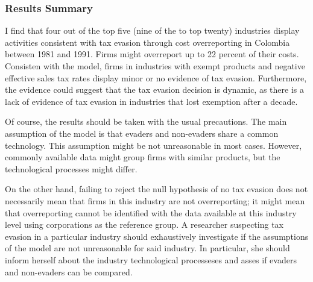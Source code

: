 \documentclass[
  12pt]{article}
\theoremstyle{definition}
\theoremstyle{remark}
\begin{document}
\subsubsection{Results Summary}\label{results-summary}

I find that four out of the top five (nine of the to top twenty)
industries display activities consistent with tax evasion through cost
overreporting in Colombia between 1981 and 1991. Firms might overreport
up to 22 percent of their costs. Consisten with the model, firms in
industries with exempt products and negative effective sales tax rates
display minor or no evidence of tax evasion. Furthermore, the evidence
could suggest that the tax evasion decision is dynamic, as there is a
lack of evidence of tax evasion in industries that lost exemption after
a decade.

Of course, the results should be taken with the usual precautions. The
main assumption of the model is that evaders and non-evaders share a
common technology. This assumption might be not unreasonable in most
cases. However, commonly available data might group firms with similar
products, but the technological processes might differ.

On the other hand, failing to reject the null hypothesis of no tax
evasion does not necessarily mean that firms in this industry are not
overreporting; it might mean that overreporting cannot be identified
with the data available at this industry level using corporations as the
reference group. A researcher suspecting tax evasion in a particular
industry should exhaustively investigate if the assumptions of the model
are not unreasonable for said industry. In particular, she should inform
herself about the industry technological processeses and asses if
evaders and non-evaders can be compared.
\end{document}
